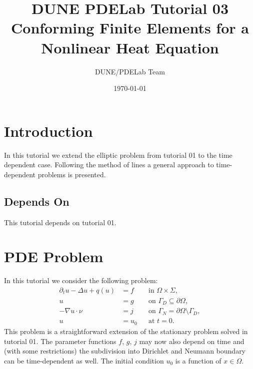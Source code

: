 \documentclass[a4paper,12pt]{article}
\title{DUNE PDELab Tutorial 03 \\
Conforming Finite Elements for a\\ Nonlinear Heat Equation}
\author{DUNE/PDELab Team}
\date{\today}
\begin{document}
\maketitle
\tableofcontents
\clearpage

\section{Introduction}

In this tutorial we extend the elliptic problem from tutorial 01 to the
time dependent case. Following the method of lines a general approach to time-dependent
problems is presented.

\subsection*{Depends On} This tutorial depends on tutorial 01.

\section{PDE Problem}

In this tutorial we consider the following problem:
\begin{align*}
\partial_t u -\Delta u + q(u) &= f &&\text{in $\Omega\times\Sigma$},\\
u &= g &&\text{on $\Gamma_D\subseteq\partial\Omega$},\\
-\nabla u\cdot \nu &= j &&\text{on $\Gamma_N=\partial\Omega\setminus\Gamma_D$},\\
u &= u_0 &&\text{at $t=0$}.
\end{align*}
This problem is a straightforward extension of the stationary
problem solved in tutorial 01.
The parameter functions $f$, $g$, $j$ may now also depend on time
and (with some restrictions) the subdivision into Dirichlet and Neumann boundary
can be time-dependent as well. The initial
condition $u_0$ is a function of $x\in\Omega$.
\end{document}
